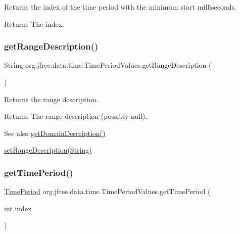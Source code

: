 Returns the index of the time period with the minimum start milliseconds.

\begin{DoxyReturn}{Returns}
The index. 
\end{DoxyReturn}
\mbox{\label{classorg_1_1jfree_1_1data_1_1time_1_1_time_period_values_a7339bc03c769eac3b89517378667b94a}} 
\subsubsection{\texorpdfstring{get\+Range\+Description()}{getRangeDescription()}}
{\footnotesize\ttfamily String org.\+jfree.\+data.\+time.\+Time\+Period\+Values.\+get\+Range\+Description (\begin{DoxyParamCaption}{ }\end{DoxyParamCaption})}

Returns the range description.

\begin{DoxyReturn}{Returns}
The range description (possibly {\ttfamily null}).
\end{DoxyReturn}
\begin{DoxySeeAlso}{See also}
\mbox{\hyperlink{classorg_1_1jfree_1_1data_1_1time_1_1_time_period_values_a75e780afe26b96d7adc5ab6518818d14}{get\+Domain\+Description()}} 

\mbox{\hyperlink{classorg_1_1jfree_1_1data_1_1time_1_1_time_period_values_a16ace4528f97c1fc68d5edb578373092}{set\+Range\+Description(\+String)}} 
\end{DoxySeeAlso}
\mbox{\label{classorg_1_1jfree_1_1data_1_1time_1_1_time_period_values_a31d30128454c319ea9d48777a00fb887}} 
\subsubsection{\texorpdfstring{get\+Time\+Period()}{getTimePeriod()}}
{\footnotesize\ttfamily \mbox{\hyperlink{interfaceorg_1_1jfree_1_1data_1_1time_1_1_time_period}{Time\+Period}} org.\+jfree.\+data.\+time.\+Time\+Period\+Values.\+get\+Time\+Period (\begin{DoxyParamCaption}\item[{int}]{index }\end{DoxyParamCaption})}

